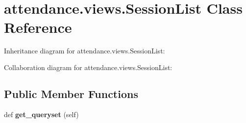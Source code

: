\hypertarget{classattendance_1_1views_1_1_session_list}{}\section{attendance.\+views.\+Session\+List Class Reference}
\label{classattendance_1_1views_1_1_session_list}


Inheritance diagram for attendance.\+views.\+Session\+List\+:


Collaboration diagram for attendance.\+views.\+Session\+List\+:
\subsection*{Public Member Functions}
\begin{DoxyCompactItemize}
\item 
\hypertarget{classattendance_1_1views_1_1_session_list_ac140327135e0a84eb72a9c0e1d79babb}{}\label{classattendance_1_1views_1_1_session_list_ac140327135e0a84eb72a9c0e1d79babb} 
def {\bfseries get\+\_\+queryset} (self)
\end{DoxyCompactItemize}
